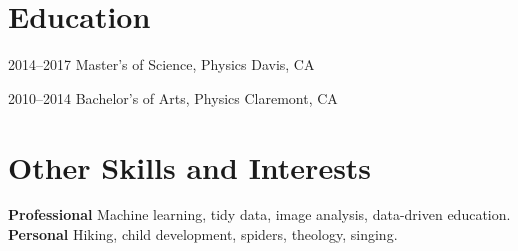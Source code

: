 \documentclass[]{cv-style}          %
\begin{document}

\section{Education}

\begin{entrylist}
\entry
{2014--2017}
{Master's of Science, Physics}
{Davis, CA}
{}

{\vspace{-0.2cm}}
\end{entrylist}
\begin{entrylist}
\entry
{2010--2014}
{Bachelor's of Arts, Physics}
{Claremont, CA}
{}
\end{entrylist}


\section{Other Skills and Interests}
  \vspace{-0.2cm}

  \textbf{Professional} \hspace{0.05cm} Machine learning, tidy data, image analysis, data-driven education. \\
  \textbf{Personal} \hspace{0.57cm} Hiking, child development, spiders, theology, singing.
  

\end{document}
